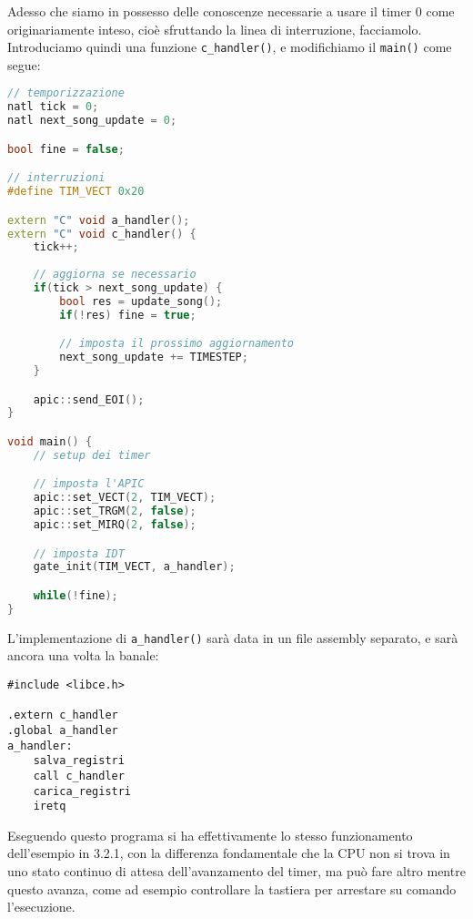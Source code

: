 \documentclass[a4paper,11pt]{article}
\begin{document}
Adesso che siamo in possesso delle conoscenze necessarie a usare il timer 0 come originariamente inteso, cioè sfruttando la linea di interruzione, facciamolo.
Introduciamo quindi una funzione \lstinline|c_handler()|, e modifichiamo il \lstinline|main()| come segue:
\begin{lstlisting}[language=C++, style=codestyle]
// temporizzazione
natl tick = 0;
natl next_song_update = 0;

bool fine = false;

// interruzioni
#define TIM_VECT 0x20

extern "C" void a_handler();
extern "C" void c_handler() {
	tick++;
	
	// aggiorna se necessario
	if(tick > next_song_update) {
		bool res = update_song();
		if(!res) fine = true; 

		// imposta il prossimo aggiornamento
		next_song_update += TIMESTEP;
	}

	apic::send_EOI();
}

void main() {
	// setup dei timer

	// imposta l'APIC
	apic::set_VECT(2, TIM_VECT);
	apic::set_TRGM(2, false);
	apic::set_MIRQ(2, false);

	// imposta IDT
	gate_init(TIM_VECT, a_handler);

	while(!fine);
}
\end{lstlisting}

L'implementazione di \lstinline|a_handler()| sarà data in un file assembly separato, e sarà ancora una volta la banale:
\begin{lstlisting}[language=assembler, style=codestyle]
#include <libce.h>

.extern c_handler
.global a_handler
a_handler:
	salva_registri
	call c_handler
	carica_registri
	iretq
\end{lstlisting}

Eseguendo questo programa si ha effettivamente lo stesso funzionamento dell'esempio in 3.2.1, con la differenza fondamentale che la CPU non si trova in uno stato continuo di attesa dell'avanzamento del timer, ma può fare altro mentre questo avanza, come ad esempio controllare la tastiera per arrestare su comando l'esecuzione.
\end{document}
